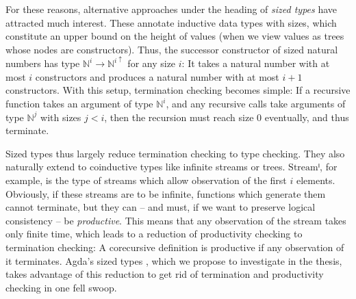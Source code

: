 \documentclass{scrartcl}
\newcommand*{\Nat}{\ensuremath{\mathrm{\mathbb{N}}}}
\begin{document}
For these reasons, alternative approaches under the heading of \emph{sized
  types} have attracted much interest. These annotate inductive data types with
sizes, which constitute an upper bound on the height of values (when we view
values as trees whose nodes are constructors). Thus, the successor constructor
of sized natural numbers has type $\Nat^i → \Nat^{i ↑}$ for any size $i$: It
takes a natural number with at most $i$ constructors and produces a natural
number with at most $i + 1$ constructors. With this setup, termination checking
becomes simple: If a recursive function takes an argument of type $\Nat^i$, and
any recursive calls take arguments of type $\Nat^j$ with sizes $j < i$, then the
recursion must reach size 0 eventually, and thus terminate.

Sized types thus largely reduce termination checking to type checking. They also
naturally extend to coinductive types like infinite streams or trees.
$\mathrm{Stream}ⁱ$, for example, is the type of streams which allow observation
of the first $i$ elements. Obviously, if these streams are to be infinite,
functions which generate them cannot terminate, but they can -- and must, if we
want to preserve logical consistency -- be \emph{productive}. This means that
any observation of the stream takes only finite time, which leads to a reduction
of productivity checking to termination checking: A corecursive definition is
productive if any observation of it terminates. Agda's sized types
\cite{abel2016}, which we propose to investigate in the thesis, takes advantage
of this reduction to get rid of termination and productivity checking in one
fell swoop.
\end{document}

